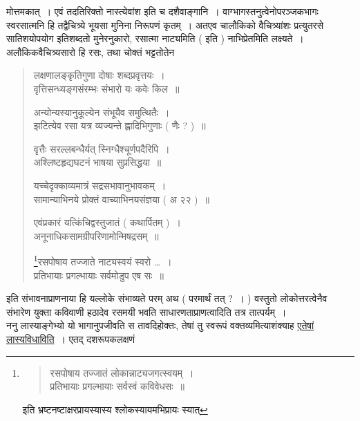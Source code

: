\documentclass[11pt, openany]{book}
\begin{document}
\vspace{2mm}
\noindent
मोत्तमकात्~। एवं तदतिरिक्तो नास्त्येवांश इति च दशैवाङ्गानि~। वाग्भागस्तनुत्वेनोपरञ्जकभागः स्वरसात्मनि हि तद्वैचित्र्ये भूयसा मुनिना निरूपणं कृतम्~। अतएव चालौकिको वैचित्र्यांशः प्रत्युतरसे सातिशयोपयोग इतिशब्दतो मुनेरनुकारो, रसात्मा नाट्यमिति ( इति ) नाभिप्रेतमिति लक्ष्यते~। अलौकिकवैचित्र्यसारो हि रसः, तथा चोक्तं भट्टतोतेन\textendash

\begin{quote}
{\qt लक्षणालङ्कृतिगुणा दोषाः शब्दप्रवृत्तयः~।\\
वृत्तिसन्ध्यङ्गसंरम्भः संभारो यः कवेः किल~॥

अन्योन्यस्यानुकूल्येन संभूयैव समुत्थितैः~।\\
झटित्येव रसा यत्र व्यज्यन्ते ह्लादिभिगुणाः ( णैः ? )~॥

वृत्तैः सरल्लबन्धैर्यत् स्निग्धैश्चूर्णपदैरिपि~।\\
अश्लिष्टहृद्यघटनं भाषया सुप्रसिद्धया~॥

यच्चेदृक्काव्यमात्रं सद्रसभावानुभावकम्~।\\
सामान्याभिनये प्रोक्तं वाच्याभिनयसंज्ञया ( अ २२ )~॥

एवंप्रकारं यत्किंचिद्वस्तुजातं ( कथार्पितम् )~।\\
अनूनाधिकसामग्रीपरिणामोन्मिषद्रसम्~॥

\renewcommand{\thefootnote}{*}\footnote{\begin{quote}
{\qt रसपोषाय तज्जातं लोकान्नाट्यजगत्स्वयम्~।\\
प्रतिभायाः प्रगल्भायाः सर्वस्वं कविवेधसः~॥}
\end{quote}
इति भ्रष्टनष्टाक्षरप्रायस्यास्य श्लोकस्यायमभिप्रायः स्यात्}रसपोषाय तज्जाते नाट्यस्वयं स्वरो \ldots~।\\
प्रतिभायाः प्रगल्भायाः सर्वमोडुप एष सः~॥}
\end{quote}

\noindent
इति संभावनाप्राणनाया हि यल्लोके संभाव्यते परम् अथ ( परमार्थं तत् ?~। ) वस्तुतो लोकोत्तरत्वेनैव संभारेण युक्ता कविवाणी हठादेव रसमयी भवति साधारणताप्राणत्वादिति तत्र तात्पर्यम्~।\\

ननु लास्याङ्गेभ्यो यो भागानुपजीवति स तावदिहोक्तः, तेषां तु स्वरूपं वक्तव्यमित्याशंक्याह \underline{एतेषां लास्यविधाविति}~। एतद् दशरूपकलक्षणं

\newpage
\end{document}
